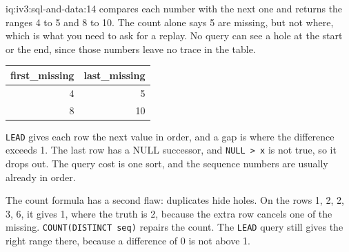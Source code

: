 \begin{solution}{iq:iv3:sql-and-data:14}
 compares each number with the next one and returns the ranges 4 to 5 and 8 to 10. The count alone says 5 are missing, but not where, which is what you need to ask for a replay. No query can see a hole at the start or the end, since those numbers leave no trace in the table.
\label{lst:iv3:sq:gaps}
\begin{center}\small
\begin{tabular}{rr}
first\_missing & last\_missing\\\hline
4 & 5\\
8 & 10
\end{tabular}
\end{center}
\texttt{LEAD} gives each row the next value in order, and a gap is where the difference exceeds 1. The last row has a NULL successor, and \texttt{NULL > x} is not true, so it drops out. The query cost is one sort, and the sequence numbers are usually already in order.

The count formula has a second flaw: duplicates hide holes. On the rows 1, 2, 2, 3, 6, it gives 1, where the truth is 2, because the extra row cancels one of the missing. \texttt{COUNT(DISTINCT seq)} repairs the count. The \texttt{LEAD} query still gives the right range there, because a difference of 0 is not above 1.

\end{solution}

